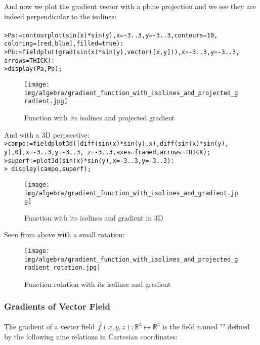 	\pagebreak
	\begin{tcolorbox}[colframe=black,colback=white,sharp corners]

	And now we plot the gradient vector with a plane projection and we see they are indeed perpendicular to the isolines:\\\\
		\texttt{>Pa:=contourplot(sin(x)*sin(y),x=-3..3,y=-3..3,contours=10,\\
		coloring=[red,blue],filled=true):
\\
	>Pb:=fieldplot(grad(sin(x)*sin(y),vector([x,y])),x=-3..3,y=-3..3,\\
	arrows=THICK):\\
	>display(Pa,Pb);}
	\begin{figure}[H]
		\centering
		\texttt{[image: img/algebra/gradient\_function\_with\_isolines\_and\_projected\_gradient.jpg]}
		\caption[]{Function with its isolines and projected gradient}
	\end{figure}
	And with a 3D perpsective:\\
	
	\texttt{>campo:=fieldplot3d([diff(sin(x)*sin(y),x),diff(sin(x)*sin(y),\\
	y),0],x=-3..3,y=-3..3,
z=-3..3,axes=framed,arrows=THICK);\\
>superf:=plot3d(sin(x)*sin(y),x=-3..3,y=-3..3):
\\
	> display({campo,superf});}
	\begin{figure}[H]
		\centering
		\texttt{[image: img/algebra/gradient\_function\_with\_isolines\_and\_gradient.jpg]}
		\caption[]{Function with its isolines and gradient in 3D}
	\end{figure}
	\end{tcolorbox}

	\pagebreak
	\begin{tcolorbox}[colframe=black,colback=white,sharp corners]
	Seen from above with a small rotation:\\
	\begin{figure}[H]
		\centering
		\texttt{[image: img/algebra/gradient\_function\_with\_isolines\_and\_projected\_gradient\_rotation.jpg]}
		\caption[]{Function rotation with its isolines and gradient}
	\end{figure}
	\end{tcolorbox}
	
	\subsubsection{Gradients of Vector Field}\label{gradient of vector field}
	The gradient of a vector field $\vec{f}(x,y,z): \mathbb{R}^3\mapsto\mathbb{R}^3$ is the field named "" defined by the following nine relations in Cartesian coordinates:
	 
